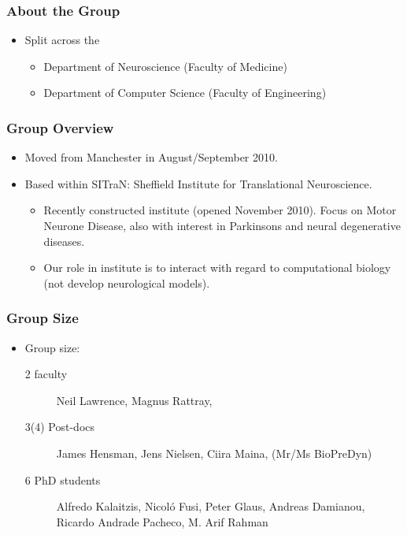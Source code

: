 \begin{frame}

  \frametitle{About the Group}

  \begin{itemize}
  \item Split across the 
    \begin{itemize}
    \item Department of Neuroscience (Faculty of Medicine)
    \item Department of Computer Science (Faculty of Engineering)
    \end{itemize}
  \end{itemize}
\end{frame}
\begin{frame}
  \frametitle{Group Overview}
  \begin{itemize}
  \item Moved from Manchester in August/September 2010.
  \item Based within SITraN: Sheffield Institute for Translational Neuroscience.
    \begin{itemize}
    \item Recently constructed institute (opened November 2010). Focus on Motor Neurone Disease, also with interest in Parkinsons and neural degenerative diseases.
    \item Our role in institute is to interact with regard to computational biology (not develop neurological models).
    \end{itemize}
  \end{itemize}
\end{frame}
\begin{frame}
  \frametitle{Group Size}
  \begin{itemize}
  \item Group size: 
    \begin{description}
    \item[2 faculty] Neil Lawrence, Magnus Rattray, 
    \item[3(4) Post-docs] James Hensman, Jens Nielsen, Ciira Maina, (Mr/Ms BioPreDyn)
    \item[6 PhD students] Alfredo Kalaitzis, Nicol\'o Fusi, Peter Glaus, Andreas Damianou, Ricardo Andrade Pacheco, M. Arif Rahman
    \end{description}
  \end{itemize}
\end{frame}
